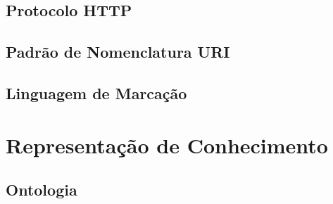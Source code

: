 
\subsection{Protocolo HTTP} %
\label{sub:protocolo_http}




\subsection{Padrão de Nomenclatura URI} %
\label{sub:padrão_de_nomenclatura_uri}


\subsection{Linguagem de Marcação} %
\label{sub:linguagem_de_marcação}



\section{Representação de Conhecimento} %
\label{sec:representação_de_conhecimento}




\subsection{Ontologia} %
\label{ssub:ontologia}



